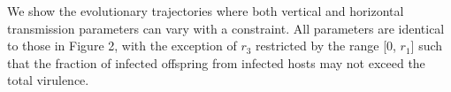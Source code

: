 We show the evolutionary trajectories where both vertical and horizontal
transmission parameters can vary with a constraint. All parameters are identical
to those in Figure 2, with the exception of $r_3$ restricted by the range
[0, $r_1$] such that the fraction of infected offspring from infected hosts
may not exceed the total virulence.

\begin{figure}[tbp]
    \centering
    \hfil

    \medskip
    \hfil


\end{figure}
